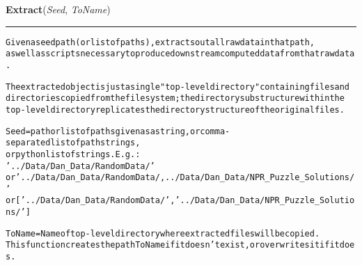 \hspace{.8\funcindent}\begin{boxedminipage}{\funcwidth}

    \raggedright \textbf{Extract}(\textit{Seed}, \textit{ToName})

    \vspace{-1.5ex}

    \rule{\textwidth}{0.5\fboxrule}
\setlength{\parskip}{2ex}
\begin{alltt}

Given a seed path (or list of paths), extracts out all raw data in that path, 
as well as scripts necessary to produce downstream computed data from that raw data.   

The extracted object is just a single "top-level directory" containing files and 
directories copied from the file system; the directory substructure within the 
top-level directory replicates the directory structure of the original files. 

Seed = path or list of paths given as a string, or comma-separated list of path strings, 
or python list of strings.  E.g.:
                        '../Data/Dan\_Data/RandomData/' 
        or              '../Data/Dan\_Data/RandomData/,../Data/Dan\_Data/NPR\_Puzzle\_Solutions/'
        or              ['../Data/Dan\_Data/RandomData/', '../Data/Dan\_Data/NPR\_Puzzle\_Solutions/']

ToName = Name of top-level directory where extracted files will be copied.   
This function creates the path ToName if it doesn't exist, or overwrites it if it does. 
        
\end{alltt}

\setlength{\parskip}{1ex}
    \end{boxedminipage}

    \label{System:extraction:Integrate}

    \vspace{0.5ex}

